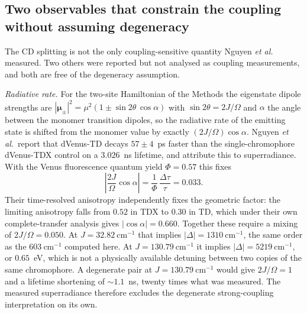 \documentclass[journal=jpcbfk, manuscript=article, layout=twocolumn, doi=true]{achemso}
\begin{document}
\subsection{Two observables that constrain the coupling without assuming
degeneracy}

The CD splitting is not the only coupling-sensitive quantity Nguyen
\emph{et al.}\cite{nguyen2025anomalous} measured. Two others were reported but
not analysed as coupling measurements, and both are free of the degeneracy
assumption.

\emph{Radiative rate.} For the two-site Hamiltonian of the Methods the
eigenstate dipole strengths are
$|\bm{\mu}_\pm|^2 = \mu^2\left(1 \pm \sin 2\theta\,\cos\alpha\right)$ with
$\sin 2\theta = 2J/\Omega$ and $\alpha$ the angle between the monomer
transition dipoles, so the radiative rate of the emitting state is shifted from
the monomer value by exactly $(2J/\Omega)\cos\alpha$. Nguyen \emph{et al.}\
report that dVenus-TD decays $57 \pm 4$~ps faster than the single-chromophore
dVenus-TDX control on a $3.026$~ns lifetime, and attribute this to
superradiance. With the Venus fluorescence quantum yield $\Phi = 0.57$ this
fixes
\begin{equation}
\left| \frac{2J}{\Omega}\cos\alpha \right|
= \frac{1}{\Phi}\,\frac{\Delta\tau}{\tau} = 0.033 .
\label{eq:superradiance}
\end{equation}
Their time-resolved anisotropy independently fixes the geometric factor: the
limiting anisotropy falls from $0.52$ in TDX to $0.30$ in TD, which under their
own complete-transfer analysis gives $|\cos\alpha| = 0.660$. Together these
require a mixing of $2J/\Omega = 0.050$. At $J = 32.82~\mathrm{cm^{-1}}$ that
implies $|\Delta| = 1310~\mathrm{cm^{-1}}$, the same order as the
$603~\mathrm{cm^{-1}}$ computed here. At $J = 130.79~\mathrm{cm^{-1}}$ it
implies $|\Delta| = 5219~\mathrm{cm^{-1}}$, or $0.65$~eV, which is not a
physically available detuning between two copies of the same chromophore. A
degenerate pair at $J = 130.79~\mathrm{cm^{-1}}$ would give
$2J/\Omega = 1$ and a lifetime shortening of $\sim\!1.1$~ns, twenty times what
was measured. The measured superradiance therefore excludes the degenerate
strong-coupling interpretation on its own.
\end{document}
